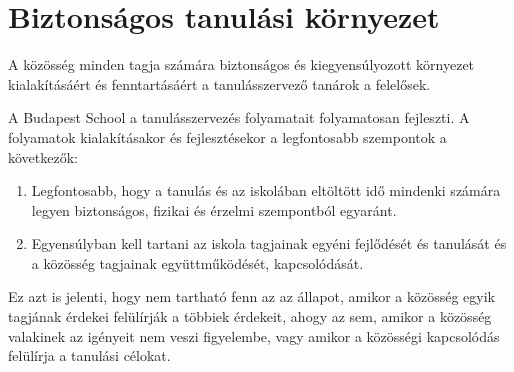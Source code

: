 \section{Biztonságos tanulási környezet}
A közösség minden tagja számára biztonságos és kiegyensúlyozott környezet kialakításáért és fenntartásáért a tanulásszervező tanárok a felelősek.

A Budapest School a tanulásszervezés folyamatait folyamatosan fejleszti. A folyamatok kialakításakor és fejlesztésekor a legfontosabb szempontok a következők:

\begin{enumerate}

      \item Legfontosabb, hogy a tanulás és az iskolában eltöltött idő mindenki számára legyen biztonságos, fizikai és érzelmi szempontból egyaránt.

      \item Egyensúlyban kell tartani az iskola  tagjainak egyéni fejlődését és tanulását és a közösség tagjainak együttműködését, kapcsolódását.

\end{enumerate}
Ez azt is jelenti, hogy nem tartható fenn az az állapot, amikor a közösség egyik tagjának érdekei felülírják a többiek érdekeit, ahogy az sem, amikor a közösség valakinek az igényeit nem veszi figyelembe, vagy amikor a közösségi kapcsolódás felülírja a tanulási célokat.
